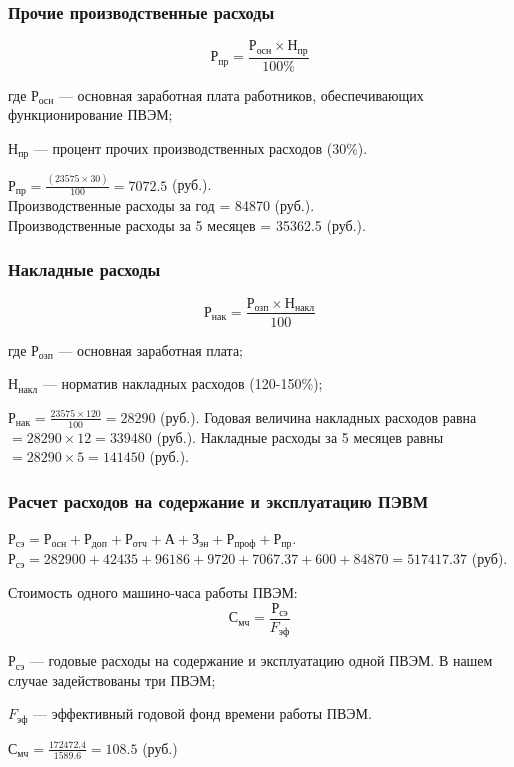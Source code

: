 \subsubsection{Прочие производственные расходы}
\begin{equation}Р_{пр}=\frac{Р_{осн} \times{} Н_{пр}}{100\%}\end{equation}
\begin{ESKDexplanation}
	\item[где ]{} $Р_{осн}$ --- основная заработная плата работников, обеспечивающих функционирование ПВЭМ;
	\item{} $Н_{пр}$ --- процент прочих производственных расходов (30\%).
\end{ESKDexplanation}
$Р_{пр} = \frac{(23575 \times{} 30)}{100} = 7072.5$ (руб.). \\
Производственные расходы за год =  84870 (руб.). \\
Производственные расходы за 5 месяцев = 35362.5 (руб.).

\subsubsection{Накладные расходы}
\begin{equation}
	Р_{нак} = \frac{Р_{озп} \times{} Н_{накл}}{100}
\end{equation}
\begin{ESKDexplanation}
	\item[где ]{} $Р_{озп}$ --- основная заработная плата;
	\item{} $Н_{накл}$ --- норматив накладных расходов (120-150\%);
\end{ESKDexplanation}
$Р_{нак} = \frac{23575 \times{} 120}{100} = 28290$ (руб.).
Годовая величина накладных расходов равна $= 28290 \times{} 12 = 339480$ (руб.).
Накладные расходы за 5 месяцев равны $= 28290 \times{} 5 = 141450$ (руб.).

\subsubsection{Расчет расходов на содержание и эксплуатацию ПЭВМ}
$Р_{сэ} = Р_{осн} + Р_{доп} + Р_{отч} + А + З_{эн} + Р_{проф} + Р_{пр}$. \\
$Р_{сэ} = 282900 + 42435 + 96186 + 9720 + 7067.37 + 600 + 84870 = 517417.37$ (руб).

Стоимость одного машино-часа работы ПВЭМ:
\begin{equation}                                                   
	С_{мч} = \frac{Р_{сэ}}{F_{эф}}
\end{equation}
\begin{ESKDexplanation}
	\item{} $Р_{сэ}$ --- годовые расходы на содержание и эксплуатацию одной ПВЭМ. В нашем случае задействованы три ПВЭМ;
	\item{} $F_{эф}$ --- эффективный годовой фонд времени работы ПВЭМ.
\end{ESKDexplanation}
$С_{мч} = \frac{172472.4}{1589.6} = 108.5$ (руб.)

